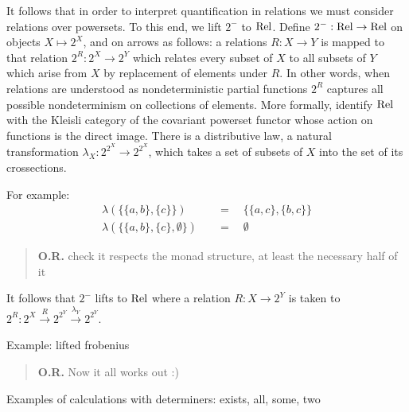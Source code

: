 \renewcommand{\wp}{2^}
It follows that in order to interpret quantification in relations we
must consider relations over powersets. 
To this end, we lift $\wp-$ to $\mathrm{Rel}$. Define $\wp- : \Rel \to
\Rel$ on objects $X \mapsto \wp X$, and on arrows as follows: a
relations $R : X \to Y$ is mapped to that relation $\wp R : \wp X \to
\wp Y$ which relates every subset of $X$ to all subsets of $Y$ which
arise from $X$ by replacement of elements under $R$. In other words,
when relations are understood as nondeterministic partial functions
$\wp R$ captures all possible nondeterminism on collections of
elements. More formally, identify $\mathrm{Rel}$ with the Kleisli
category of the covariant powerset functor whose action on functions
is the direct image. There is a distributive law, a natural
transformation $\lambda_X : \wp{\wp X} \to \wp{\wp X}$, which takes a
set of subsets of $X$ into the set of its crossections. 

For example: 
\begin{align*}
\lambda (\{\{a,b\},\{c\}\}) & \quad = \quad \{\{a,c\},\{b,c\}\}\\
\lambda (\{\{a,b\},\{c\},\emptyset\}) &\quad = \quad \emptyset
\end{align*}

\begin{quote}
{\bf O.R.} check it respects the monad structure, at least the necessary
  half of it 
\end{quote}

It follows that $\wp-$ lifts to $\mathrm{Rel}$ where a
relation $R :  X \to \wp Y$ is taken to $\wp R : \wp X \xrightarrow{R} \wp {\wp Y}
\xrightarrow{\lambda_Y} \wp {\wp Y}$.


Example: lifted frobenius

\begin{quote}
{\bf O.R.} Now it all works out :)
\end{quote}


Examples of calculations with determiners: exists, all, some, two





